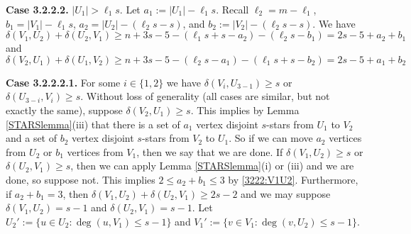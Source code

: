 \documentclass[oneside,12pt]{memoir}
\begin{document}
% 
% 
% 
% 






\textbf{Case 3.2.2.2.} $|U_1|>\ell_1s$.  Let $a_1:=|U_1|-\ell_1s$.  Recall $\ell_2=m-\ell_1$, $b_1=|V_1|-\ell_1s$, $a_2=|U_2|-(\ell_2s-s)$, and $b_2:=|V_2|-(\ell_2s-s)$.  We have
\begin{equation}\label{3222:V1U2}
\delta(V_1, U_2)+\delta(U_2, V_1)\geq n+3s-5-(\ell_1s+s-a_2)-(\ell_2s-b_1)=2s-5+a_2+b_1
\end{equation}
and
\begin{equation}\label{3222:V2U1}
\delta(V_2, U_1)+\delta(U_1, V_2)\geq n+3s-5-(\ell_2s-a_1)-(\ell_1s+s-b_2)=2s-5+a_1+b_2
\end{equation}

\textbf{Case 3.2.2.2.1.} For some $i\in\{1,2\}$ we have $\delta(V_i, U_{3-1})\geq s$ or $\delta(U_{3-i}, V_i)\geq s$.  Without loss of generality (all cases are similar, but not exactly the same), suppose $\delta(V_2, U_1)\geq s$.  This implies by Lemma \ref{STARSlemma}(iii) that there is a set of $a_1$ vertex disjoint $s$-stars from $U_1$ to $V_2$ and a set of $b_2$ vertex disjoint $s$-stars from $V_2$ to $U_1$.  So if we can move $a_2$ vertices from $U_2$ or $b_1$ vertices from $V_1$, then we say that we are done.  If $\delta(V_1, U_2)\geq s$ or $\delta(U_2, V_1)\geq s$, then we can apply Lemma \ref{STARSlemma}(i) or (iii) and we are done, so suppose not.  This implies $2\leq a_2+b_1\leq 3$ by \eqref{3222:V1U2}.  Furthermore, if $a_2+b_1=3$, then $\delta(V_1, U_2)+\delta(U_2, V_1)\geq 2s-2$ and we may suppose $\delta(V_1, U_2)=s-1$ and $\delta(U_2, V_1)=s-1$.  Let $U_2':=\{u\in U_2:\deg(u, V_1)\leq s-1\}$ and $V_1':=\{v\in V_1:\deg(v, U_2)\leq s-1\}$.  
\end{document}
